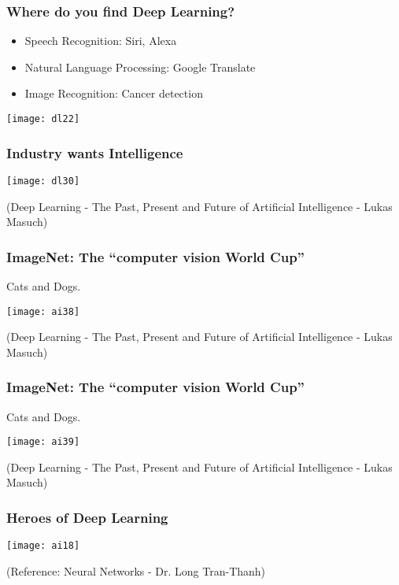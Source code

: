 \begin{frame}[fragile] \frametitle{Where do you find Deep Learning?}

\begin{itemize}
\item Speech Recognition: Siri, Alexa
\item Natural Language Processing: Google Translate
\item Image Recognition: Cancer detection
\end{itemize}
\begin{center}
\texttt{[image: dl22]}
\end{center}
\end{frame}

\begin{frame}[fragile]\frametitle{Industry wants Intelligence}
\begin{center}
\texttt{[image: dl30]}
\end{center}
{\tiny (Deep Learning - The Past, Present and Future of Artificial Intelligence - Lukas Masuch)}
\end{frame}

\begin{frame}[fragile]\frametitle{ImageNet: The ``computer vision World Cup''}
Cats and Dogs.
\begin{center}
\texttt{[image: ai38]}
\end{center}
{\tiny (Deep Learning - The Past, Present and Future of Artificial Intelligence - Lukas Masuch)}
\end{frame}

\begin{frame}[fragile]\frametitle{ImageNet: The ``computer vision World Cup''}
Cats and Dogs.
\begin{center}
\texttt{[image: ai39]}
\end{center}
{\tiny (Deep Learning - The Past, Present and Future of Artificial Intelligence - Lukas Masuch)}
\end{frame}



\begin{frame}[fragile] \frametitle{Heroes of Deep Learning}

\begin{center}
\texttt{[image: ai18]}
\end{center}

\tiny{(Reference: Neural Networks - Dr. Long Tran-Thanh)}
\end{frame}



